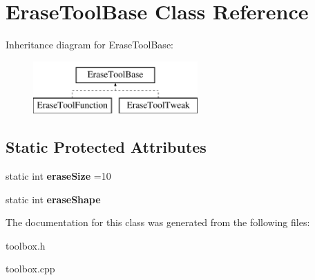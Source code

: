 \hypertarget{class_erase_tool_base}{\section{Erase\-Tool\-Base Class Reference}
\label{class_erase_tool_base}
}
Inheritance diagram for Erase\-Tool\-Base\-:\begin{figure}[H]
\begin{center}
\leavevmode
\includegraphics[height=2.000000cm]{class_erase_tool_base}
\end{center}
\end{figure}
\subsection*{Static Protected Attributes}
\begin{DoxyCompactItemize}
\item 
\hypertarget{class_erase_tool_base_a84600e8278accbb05e60f0c6f0a72364}{static int {\bfseries erase\-Size} =10}\label{class_erase_tool_base_a84600e8278accbb05e60f0c6f0a72364}

\item 
\hypertarget{class_erase_tool_base_a81e6975fa020c00e9e50cec440a96783}{static int {\bfseries erase\-Shape}}\label{class_erase_tool_base_a81e6975fa020c00e9e50cec440a96783}

\end{DoxyCompactItemize}


The documentation for this class was generated from the following files\-:\begin{DoxyCompactItemize}
\item 
toolbox.\-h\item 
toolbox.\-cpp\end{DoxyCompactItemize}
